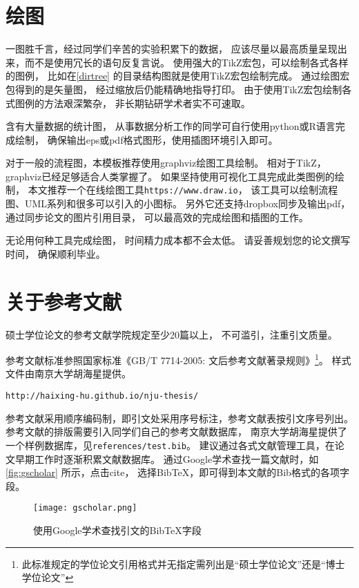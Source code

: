 \section{绘图}\label{how-to-plot}

一图胜千言，经过同学们辛苦的实验积累下的数据，
应该尽量以最高质量呈现出来，而不是使用冗长的语句反复言说。
使用强大的TikZ宏包，可以绘制各式各样的图例，
比如在\ref{dirtree} 的目录结构图就是使用TikZ宏包绘制完成。
通过绘图宏包得到的是矢量图，
经过缩放后仍能精确地指导打印。
由于使用TikZ宏包绘制各式图例的方法艰深繁杂，
非长期钻研学术者实不可速取。


含有大量数据的统计图，
从事数据分析工作的同学可自行使用python或R语言完成绘制，
确保输出eps或pdf格式图形，使用插图环境引入即可。

对于一般的流程图，本模板推荐使用graphviz绘图工具绘制。
相对于TikZ，graphviz已经足够适合人类掌握了。
如果坚持使用可视化工具完成此类图例的绘制，
本文推荐一个在线绘图工具\texttt{https://www.draw.io}，
该工具可以绘制流程图、UML系列和很多可以引入的小图标。
另外它还支持dropbox同步及输出pdf，通过同步论文的图片引用目录，
可以最高效的完成绘图和插图的工作。

无论用何种工具完成绘图，
时间精力成本都不会太低。
请妥善规划您的论文撰写时间，
确保顺利毕业。

\section{关于参考文献}

硕士学位论文的参考文献学院规定至少20篇以上，
不可滥引，注重引文质量。

参考文献标准参照国家标准《GB/T 7714-2005: 文后参考文献著录规则》\footnote{此标准规定的学位论文引用格式并无指定需列出是“硕士学位论文”还是“博士学位论文”}。
样式文件由南京大学胡海星提供。
\begin{verbatim}
http://haixing-hu.github.io/nju-thesis/
\end{verbatim}

参考文献采用顺序编码制，即引文处采用序号标注，参考文献表按引文序号列出。
参考文献的排版需要引入同学们自己的参考文献数据库，
南京大学胡海星提供了一个样例数据库，见\texttt{references/test.bib}。
建议通过各式文献管理工具，在论文早期工作时逐渐积累文献数据库。
通过Google学术查找一篇文献时，如\autoref{fig:gscholar} 所示，点击cite，
选择BibTeX，即可得到本文献的Bib格式的各项字段。
\begin{figure}[htbp]
    \centering
    \texttt{[image: gscholar.png]}
    \caption{使用Google学术查找引文的BibTeX字段}
    \label{fig:gscholar}
\end{figure}

